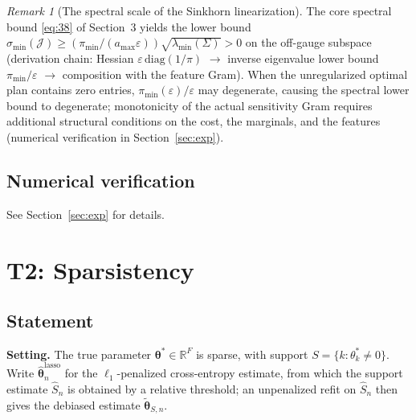 \documentclass[11pt,a4paper]{article}
\theoremstyle{remark}
\newtheorem{remark}[theorem]{Remark}
\begin{document}
\begin{remark}[The spectral scale of the Sinkhorn linearization]
The core spectral bound \eqref{eq:38} of Section~3 yields the lower bound
$\sigma_{\min}(\mathcal{J})\ge(\pi_{\min}/(a_{\max}\varepsilon))\sqrt{\lambda_{\min}(\Sigma)}>0$
on the off-gauge subspace (derivation chain: Hessian $\varepsilon\,\mathrm{diag}(1/\pi)$
$\to$ inverse eigenvalue lower bound $\pi_{\min}/\varepsilon$ $\to$ composition with the
feature Gram). When the unregularized optimal plan contains zero entries,
$\pi_{\min}(\varepsilon)/\varepsilon$ may degenerate, causing the spectral lower bound to
degenerate; monotonicity of the actual sensitivity Gram requires additional structural
conditions on the cost, the marginals, and the features (numerical verification in
Section~\ref{sec:exp}).
\end{remark}

\subsection{Numerical verification}

See Section~\ref{sec:exp} for details.

\section{T2: Sparsistency}\label{sec:t2}

\subsection{Statement}

\textbf{Setting.} The true parameter $\bm{\theta}^*\in\mathbb{R}^F$ is sparse, with support
$S=\{k:\theta_k^*\ne0\}$. Write $\widehat{\bm{\theta}}_n^{\mathrm{lasso}}$ for the
$\ell_1$-penalized cross-entropy estimate, from which the support estimate $\widehat S_n$
is obtained by a relative threshold; an unpenalized refit on $\widehat S_n$ then gives the
debiased estimate $\widetilde{\bm{\theta}}_{S,n}$.
\end{document}

